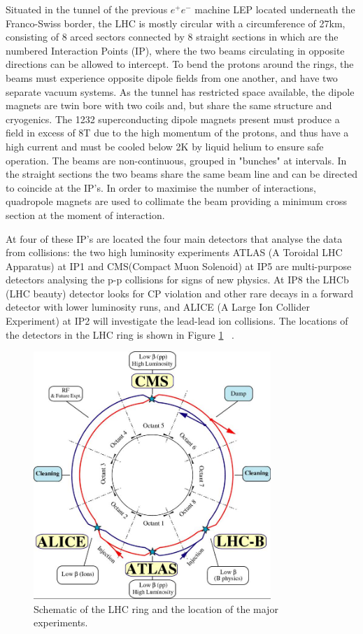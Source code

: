 Situated in the tunnel of the previous $e^{+}e^{-}$ machine LEP located underneath the Franco-Swiss border,  the LHC is mostly circular with a circumference of 27km, consisting of 8 arced sectors connected by 8 straight sections in which are the numbered Interaction Points (IP), where the two beams circulating in opposite directions can be allowed to intercept. To bend the protons around the rings, the beams must experience opposite dipole fields from one another, and have two separate vacuum systems. As the tunnel has restricted space available, the dipole magnets are twin bore with two coils and, but share the same structure and cryogenics. The 1232 superconducting dipole magnets present must produce a field in excess of 8T due to the high momentum of the protons, and thus have a high current and must be cooled below 2K by liquid helium to ensure safe operation. The beams are non-continuous, grouped in "bunches" at intervals. In the straight sections the two beams share the same beam line and can be directed to coincide at the IP's. In order to maximise the number of interactions, quadropole magnets are used to collimate the beam providing a minimum cross section at the moment of interaction.

At four of these IP's are located the four main detectors that analyse the data from collisions: the two high luminosity experiments ATLAS (A Toroidal LHC Apparatus) at IP1 and CMS(Compact Muon Solenoid) at IP5 are multi-purpose detectors analysing the p-p collisions for signs of new physics. At IP8 the LHCb (LHC beauty) detector looks for CP violation and other rare decays in a forward detector with lower luminosity runs, and ALICE (A Large Ion Collider Experiment) at IP2 will investigate the lead-lead ion collisions. The locations of the detectors in the LHC ring is shown in Figure \ref{fig:LHC}~\cite{LHCConcept} .

\begin{figure}
\centering
\includegraphics[width=0.8\textwidth]{Figures/Detector/lhc-schematic}
\caption{Schematic of the LHC ring and the location of the major experiments.}
\label{fig:LHC}
\end{figure}


